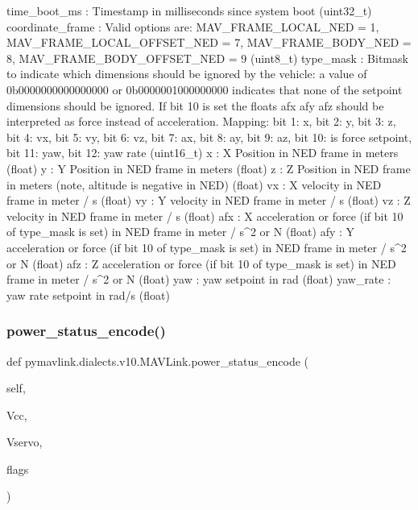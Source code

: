 \begin{DoxyVerb}
\begin{DoxyVerb}
\begin{DoxyVerb}
\begin{DoxyVerb}
\begin{DoxyVerb}
time_boot_ms              : Timestamp in milliseconds since system boot (uint32_t)
coordinate_frame          : Valid options are: MAV_FRAME_LOCAL_NED = 1, MAV_FRAME_LOCAL_OFFSET_NED = 7, MAV_FRAME_BODY_NED = 8, MAV_FRAME_BODY_OFFSET_NED = 9 (uint8_t)
type_mask                 : Bitmask to indicate which dimensions should be ignored by the vehicle: a value of 0b0000000000000000 or 0b0000001000000000 indicates that none of the setpoint dimensions should be ignored. If bit 10 is set the floats afx afy afz should be interpreted as force instead of acceleration. Mapping: bit 1: x, bit 2: y, bit 3: z, bit 4: vx, bit 5: vy, bit 6: vz, bit 7: ax, bit 8: ay, bit 9: az, bit 10: is force setpoint, bit 11: yaw, bit 12: yaw rate (uint16_t)
x                         : X Position in NED frame in meters (float)
y                         : Y Position in NED frame in meters (float)
z                         : Z Position in NED frame in meters (note, altitude is negative in NED) (float)
vx                        : X velocity in NED frame in meter / s (float)
vy                        : Y velocity in NED frame in meter / s (float)
vz                        : Z velocity in NED frame in meter / s (float)
afx                       : X acceleration or force (if bit 10 of type_mask is set) in NED frame in meter / s^2 or N (float)
afy                       : Y acceleration or force (if bit 10 of type_mask is set) in NED frame in meter / s^2 or N (float)
afz                       : Z acceleration or force (if bit 10 of type_mask is set) in NED frame in meter / s^2 or N (float)
yaw                       : yaw setpoint in rad (float)
yaw_rate                  : yaw rate setpoint in rad/s (float)\end{DoxyVerb}
 \mbox{\label{classpymavlink_1_1dialects_1_1v10_1_1MAVLink_aa3e4bc66a128e509240f2f4713f1490c}} 
\subsubsection{\texorpdfstring{power\+\_\+status\+\_\+encode()}{power\_status\_encode()}}
{\footnotesize\ttfamily def pymavlink.\+dialects.\+v10.\+M\+A\+V\+Link.\+power\+\_\+status\+\_\+encode (\begin{DoxyParamCaption}\item[{}]{self,  }\item[{}]{Vcc,  }\item[{}]{Vservo,  }\item[{}]{flags }\end{DoxyParamCaption})}


\end{DoxyVerb}
\end{DoxyVerb}
\end{DoxyVerb}
\end{DoxyVerb}
